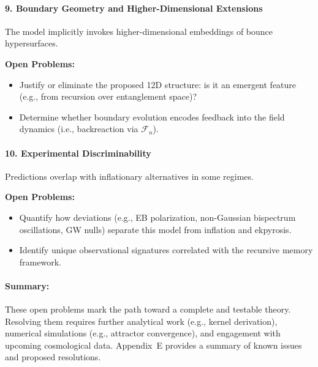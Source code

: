 \paragraph{9. Boundary Geometry and Higher-Dimensional Extensions}

The model implicitly invokes higher-dimensional embeddings of bounce hypersurfaces.

\textbf{Open Problems:}
\begin{itemize}
    \item Justify or eliminate the proposed 12D structure: is it an emergent feature (e.g., from recursion over entanglement space)?
    \item Determine whether boundary evolution encodes feedback into the field dynamics (i.e., backreaction via \( \mathcal{F}_n \)).
\end{itemize}

\paragraph{10. Experimental Discriminability}

Predictions overlap with inflationary alternatives in some regimes.

\textbf{Open Problems:}
\begin{itemize}
    \item Quantify how deviations (e.g., EB polarization, non-Gaussian bispectrum oscillations, GW nulls) separate this model from inflation and ekpyrosis.
    \item Identify unique observational signatures correlated with the recursive memory framework.
\end{itemize}

\paragraph{Summary:}

These open problems mark the path toward a complete and testable theory. Resolving them requires further analytical work (e.g., kernel derivation), numerical simulations (e.g., attractor convergence), and engagement with upcoming cosmological data. Appendix~E provides a summary of known issues and proposed resolutions.
